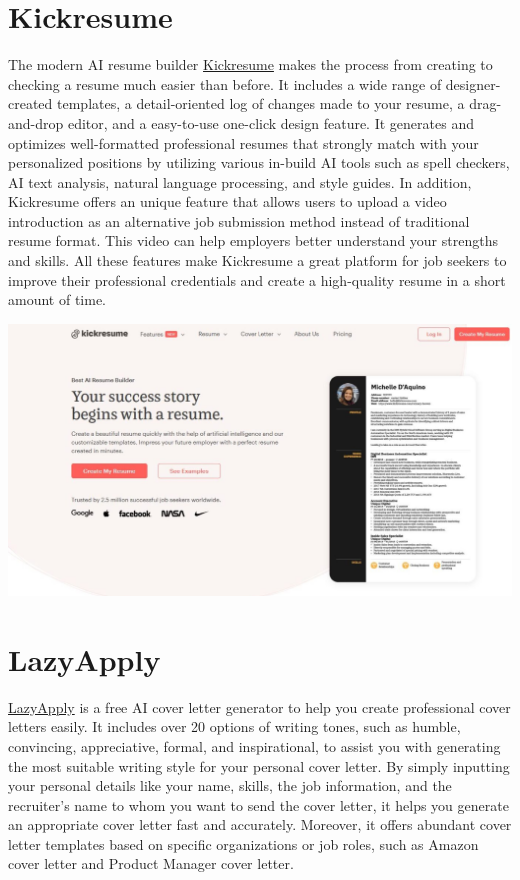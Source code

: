 \documentclass[
]{book}
\begin{document}
\hypertarget{kickresume}{%
\section{Kickresume}\label{kickresume}}

The modern AI resume builder \href{https://www.kickresume.com/en/}{Kickresume} makes the process from creating to checking a resume much easier than before. It includes a wide range of designer-created templates, a detail-oriented log of changes made to your resume, a drag-and-drop editor, and a easy-to-use one-click design feature. It generates and optimizes well-formatted professional resumes that strongly match with your personalized positions by utilizing various in-build AI tools such as spell checkers, AI text analysis, natural language processing, and style guides. In addition, Kickresume offers an unique feature that allows users to upload a video introduction as an alternative job submission method instead of traditional resume format. This video can help employers better understand your strengths and skills. All these features make Kickresume a great platform for job seekers to improve their professional credentials and create a high-quality resume in a short amount of time.

\includegraphics[width=5.46875in,height=\textheight]{Kickresume pic.png}

\hypertarget{lazyapply}{%
\section{LazyApply}\label{lazyapply}}

\href{https://lazyapply.com/cover-letter-generator}{LazyApply} is a free AI cover letter generator to help you create professional cover letters easily. It includes over 20 options of writing tones, such as humble, convincing, appreciative, formal, and inspirational, to assist you with generating the most suitable writing style for your personal cover letter. By simply inputting your personal details like your name, skills, the job information, and the recruiter's name to whom you want to send the cover letter, it helps you generate an appropriate cover letter fast and accurately. Moreover, it offers abundant cover letter templates based on specific organizations or job roles, such as Amazon cover letter and Product Manager cover letter.
\end{document}
